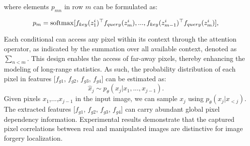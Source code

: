 \documentclass[10pt,journal,compsoc]{IEEEtran}
\begin{document}
where elements $p_{mn}$ in row $m$ can be formulated as:
\begin{footnotesize}
\begin{equation}
     p_{m} = {\rm softmax}[f_{key}(z^{i}_{1})^{\top}f_{query}(z^{i}_{m}), ... ,f_{key}(z^{i}_{m-1})^{\top}f_{query}(z^{i}_{m})],
\end{equation}
\end{footnotesize}
Each conditional can access any pixel within its context through the attention operator, as indicated by the summation over all available context, denoted as $\sum_{n<m}$. This design enables the access of far-away pixels, thereby enhancing the modeling of long-range statistics. As such, the probability distribution of each pixel in features [$f_{g1}$, $f_{g2}$, $f_{g3}$, $f_{g4}$] can be estimated as: 
\begin{equation}
     {\hat{x}_{j}} \sim p_{\theta}(x_{j}|x_{1},...,x_{j-1}).
\end{equation}
Given pixels $x_{1}$,...,$x_{j-1}$ in the input image, we can sample $x_{j}$ using $p_{\theta}(x_{j}|x_{<j})$. The extracted features [$f_{g1}$, $f_{g2}$, $f_{g3}$, $f_{g4}$] can carry abundant global pixel dependency information. Experimental results demonstrate that the captured pixel correlations between real and manipulated images are distinctive for image forgery localization. 


\end{document}
